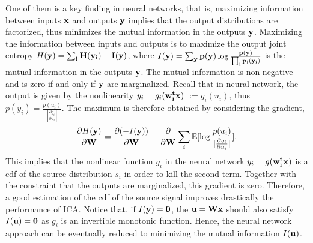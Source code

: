 \documentclass[aps,prl,preprint,superscriptaddress]{revtex4-2}
\begin{document}
One of them is a key finding in neural networks, that is, maximizing information between inputs $\bf{x}$ and outputs $\bf{y}$ implies that the output distributions are factorized, thus minimizes the mutual information in the outputs $\bf{y}$. Maximizing the information between inputs and outputs is to maximize the output joint entropy $H(\bf{y}) = \sum_{i}H(y_{i}) - I(\bf{y})$, where $I(\bf{y}) = \sum_{\bf{y}}p(\bf{y})\log\frac{p(\bf{y})}{\prod_{i}p_{i}(y_{i})}$ is the mutual information in the outputs $\bf{y}$. The mutual information is non-negative and is zero if and only if $\bf{y}$ are marginalized. Recall that in neural network, the output is given by the nonlinearity $y_{i} = g_{i}(\bf{w}_{i}^{t}\bf{x})$ $:= g_{i}(u_{i})$, thus $p(y_{i}) = \frac{p(u_{i})}{|\frac{\partial g_{i}}{\partial u_{i}}|}$. The maximum is therefore obtained by considering the gradient,
\begin{equation}
\frac{\partial H(\bf{y})}{\partial \bf{W}} = \frac{\partial (-I(\bf{y}))}{\partial \bf{W}} -\frac{\partial}{\partial \bf{W}}\sum_{i} \mathbb{E}[\log \frac{p(u_{i})}{|\frac{\partial g_{i}}{\partial u_{i}}|} ]. 
\end{equation}
This implies that the nonlinear function $g_{i}$ in the neural network $y_{i} = g(\bf{w}_{i}^{t}\bf{x})$ is a cdf of the source distribution $s_{i}$ in order to kill the second term. Together with the constraint that the outputs are marginalized, this gradient is zero. Therefore, a good estimation of the cdf of the source signal improves drastically the performance of ICA. Notice that, if $I(\bf{y}) = 0$, the $\bf{u} = \bf{W}\bf{x}$ should also satisfy $I(\bf{u}) = 0$ as $g_{i}$ is an invertible monotonic function. Hence, the neural network approach can be eventually reduced to minimizing the mutual information $I(\bf{u})$.
\end{document}
